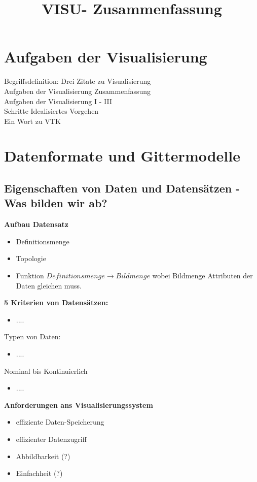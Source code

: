 \documentclass{article}
\title{\vspace{-5mm}%
	\fontsize{24pt}{10pt}\selectfont
	\textbf{VISU- Zusammenfassung}
}
\begin{document}
\maketitle	
\pagebreak

\tableofcontents

\section{Aufgaben der Visualisierung}
Begriffsdefinition: Drei Zitate zu Visualisierung\\
Aufgaben der Visualisierung Zusammenfassung\\
Aufgaben der Visualisierung I - III\\
Schritte Idealisiertes Vorgehen\\
Ein Wort zu VTK
\pagebreak

\section{Datenformate und Gittermodelle}
\subsection{Eigenschaften von Daten und Datensätzen - Was bilden wir ab?} 
\textbf{Aufbau Datensatz}\\

\begin{itemize}[noitemsep]
	\item Definitionsmenge
	\item Topologie
	\item Funktion $Definitionsmenge \rightarrow Bildmenge$ wobei Bildmenge Attributen der Daten gleichen muss.
\end{itemize}


\noindent \textbf{5 Kriterien von Datensätzen:}
\begin{itemize}[noitemsep]
	\item ....
\end{itemize}

\noindent Typen von Daten:
\begin{itemize}[noitemsep]
	\item ....
\end{itemize}
Nominal bis Kontinuierlich
\begin{itemize}[noitemsep]
	\item ....
\end{itemize}

\noindent \textbf{Anforderungen ans Visualisierungssystem}
\begin{itemize}[noitemsep]
	\item effiziente Daten-Speicherung
	\item effizienter Datenzugriff
	\item Abbildbarkeit (?)
	\item Einfachheit (?)
\end{itemize}
\end{document}
